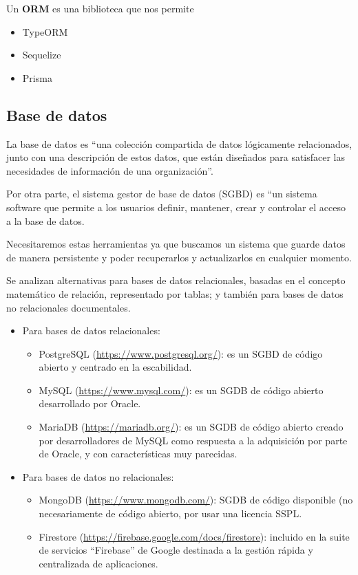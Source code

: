 Un \textbf{ORM} es una biblioteca que nos permite 

\begin{itemize}
    \item TypeORM
    \item Sequelize
    \item Prisma
\end{itemize}

\subsection{Base de datos}

La base de datos es ``una colección compartida de datos lógicamente relacionados, junto con una descripción de estos datos, que están diseñados para satisfacer las necesidades de información de una organización''.\cite{alma991009264529704990}

Por otra parte, el sistema gestor de base de datos (SGBD) es ``un sistema software que permite a los usuarios definir, mantener, crear y controlar el acceso a la base de datos.\cite{alma991009264529704990}

Necesitaremos estas herramientas ya que buscamos un sistema que guarde datos de manera persistente y poder recuperarlos y actualizarlos en cualquier momento.

Se analizan alternativas para bases de datos relacionales, basadas en el concepto matemático de relación, representado por tablas\cite{alma991009264529704990}; y también para bases de datos no relacionales documentales.

\begin{itemize}
    \item Para bases de datos relacionales:
    \begin{itemize}
        \item PostgreSQL (\url{https://www.postgresql.org/}): es un SGBD de código abierto y centrado en la escabilidad.
        \item MySQL (\url{https://www.mysql.com/}): es un SGDB de código abierto desarrollado por Oracle.
        \item MariaDB (\url{https://mariadb.org/}): es un SGDB de código abierto creado por desarrolladores de MySQL como respuesta a la adquisición por parte de Oracle, y con características muy parecidas.
    \end{itemize}
    \item Para bases de datos no relacionales:
    \begin{itemize}
        \item MongoDB (\url{https://www.mongodb.com/}): SGDB de código disponible (no necesariamente de código abierto, por usar una licencia SSPL.\cite{ssplLicense}
        \item Firestore (\url{https://firebase.google.com/docs/firestore}): incluido en la suite de servicios ``Firebase'' de Google destinada a la gestión rápida y centralizada de aplicaciones.
    \end{itemize}
\end{itemize}

